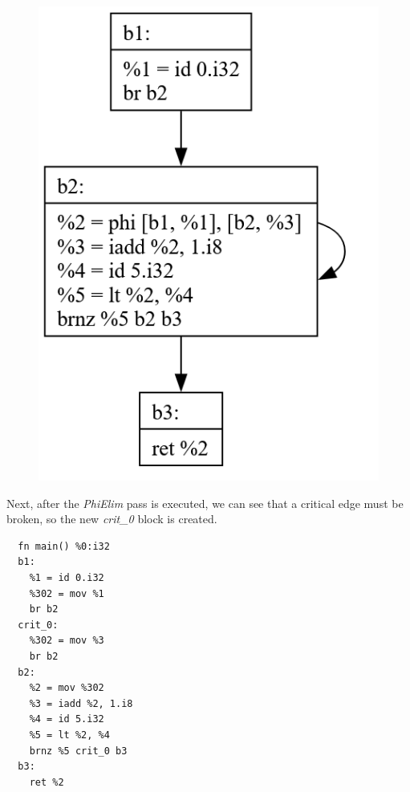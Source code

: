 \documentclass[11pt, a4paper, titlepage]{article}
\begin{document}
\begin{figure}[H]
  \centering
  \includegraphics[scale=0.3]{images/i2.png}
\end{figure}

Next, after the \textit{PhiElim} pass is executed,
we can see that a critical edge must be broken, so the new \textit{crit\_0} block is created.

\begin{lstlisting}
  fn main() %0:i32
  b1:
    %1 = id 0.i32
    %302 = mov %1
    br b2
  crit_0:
    %302 = mov %3
    br b2
  b2:
    %2 = mov %302
    %3 = iadd %2, 1.i8
    %4 = id 5.i32
    %5 = lt %2, %4
    brnz %5 crit_0 b3
  b3:
    ret %2
\end{lstlisting}
\end{document}
